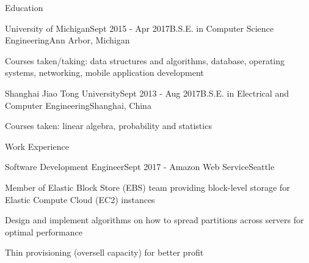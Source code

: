 \documentclass{resume} %
\begin{document}

\begin{rSection}{Education}
\begin{rSubsection}{University of Michigan}{Sept 2015 - Apr 2017}{B.S.E. in Computer Science Engineering}{Ann Arbor, Michigan}
	\item Courses taken/taking: data structures and algorithms, database, operating systems, networking, mobile application development
\end{rSubsection}

\begin{rSubsection}{Shanghai Jiao Tong University}{Sept 2013 - Aug 2017}{B.S.E. in Electrical and Computer Engineering}{Shanghai, China}
	\item Courses taken: linear algebra, probability and statistics
\end{rSubsection}



\end{rSection}

\begin{rSection}{Work Experience}
	\begin{rSubsection}{Software Development Engineer}{Sept 2017 - }{Amazon Web Service}{Seattle}
		\item Member of Elastic Block Store (EBS) team providing block-level storage for Elastic Compute Cloud (EC2) instances
		\item Design and implement algorithms on how to spread partitions across servers for optimal performance
		\item Thin provisioning (oversell capacity) for better profit
	\end{rSubsection}
\end{rSection}
\end{document}
